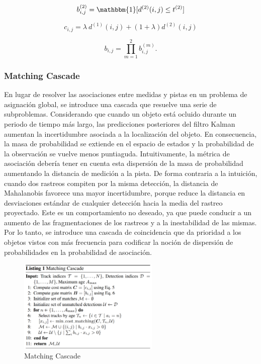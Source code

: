 \begin{equation}
\label{eq:equation4-deepsort}
b_{i,j}^{(2)} = \mathbbm{1}[d^{(2)} (i,j) \leq t^{(2)}]
\end{equation}

\begin{equation}
\label{eq:equation5-deepsort}
c_{i,j} = \lambda \ d^{(1)}(i,j) + (1 + \lambda)d^{(2)}(i,j)
\end{equation}

\begin{equation}
\label{eq:equation6-deepsort}
b_{i,j} = \prod_{m=1}^{2} b_{i,j}^{(m)}.
\end{equation}

\subsubsection*{Matching Cascade}
\label{subsubsec:matching-cascade}

En lugar de resolver las asociaciones entre medidas y pistas en un problema de asignación global, se introduce una cascada que resuelve una serie de subproblemas. Considerando que cuando un objeto está ocluido durante un periodo de tiempo más largo, las predicciones posteriores del filtro Kalman aumentan la incertidumbre asociada a la localización del objeto. En consecuencia, la masa de probabilidad se extiende en el espacio de estados y la probabilidad de la observación se vuelve menos puntiaguda. Intuitivamente, la métrica de asociación debería tener en cuenta esta dispersión de la masa de probabilidad aumentando la distancia de medición a la pista. De forma contraria a la intuición, cuando dos rastreos compiten por la misma detección, la distancia de Mahalanobis favorece una mayor incertidumbre, porque reduce la distancia en desviaciones estándar de cualquier detección hacia la media del rastreo proyectado. Este es un comportamiento no deseado, ya que puede conducir a un aumento de las fragmentaciones de los rastreos y a la inestabilidad de las mismas. Por lo tanto, se introduce una cascada de coincidencia que da prioridad a los objetos vistos con más frecuencia para codificar la noción de dispersión de probabilidades en la probabilidad de asociación.

\begin{figure}[ht]
\centering
\includegraphics[width=0.6\textwidth]{img/chapters/estado-del-arte/matching-cascade.png}
\caption{\label{fig:matching-cascade}Matching Cascade}
\end{figure}

